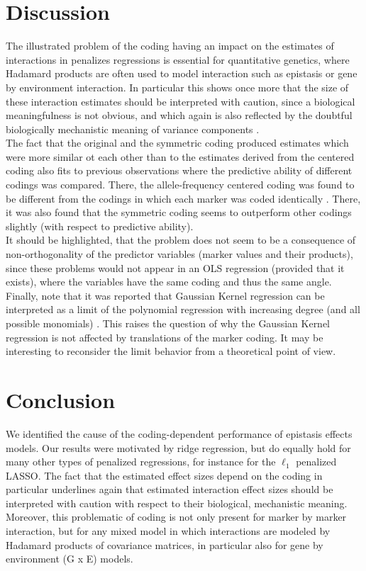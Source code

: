 \documentclass{bmcart}
\newcommand{\0}{\mathbf{0}}
\begin{document}
\section*{Discussion}
The illustrated problem of the coding having an impact on the estimates of interactions in penalizes regressions is essential for quantitative genetics, where Hadamard products are often used to model interaction such as epistasis or gene by environment interaction. In particular this shows once more that the size of these interaction estimates should be interpreted with caution, since a biological meaningfulness is not obvious, and which again is also reflected by the doubtful biologically mechanistic meaning of variance components \cite{Huang16}.\\

The fact that the original and the symmetric coding produced estimates which were more similar ot each other than to the estimates derived from the centered coding also fits to previous observations where the predictive ability of different codings was compared. There, the allele-frequency centered coding was found to be different from the codings in which each marker was coded identically \cite{Martini17}. 
There, it was also found that the symmetric coding seems to outperform other codings slightly (with respect to predictive ability). \\

It should be highlighted, that the problem does not seem to be a consequence of non-orthogonality of the predictor variables (marker values and their products), since these problems would not appear in an OLS regression (provided that it exists), where the variables have the same coding and thus the same angle. \\

Finally, note that it was reported that Gaussian Kernel regression \cite{Morota14} can be interpreted as a limit of the polynomial regression with increasing degree (and all possible monomials) \cite{jiang15}. 
This raises the question of why the Gaussian Kernel regression is not affected by translations of the marker coding. It may be interesting to reconsider the limit behavior from a theoretical point of view.


\section*{Conclusion}
We identified the cause of the coding-dependent performance of epistasis effects models. Our results were motivated by ridge regression, but do equally hold for many other types of penalized regressions, for instance for the $\ell_1$ penalized LASSO. The fact that the estimated effect sizes depend on the coding in particular underlines again that estimated interaction effect sizes should be interpreted with caution with respect to their biological, mechanistic meaning. Moreover, this problematic of coding is not only present for marker by marker interaction, but for any mixed model in which interactions are modeled by Hadamard products of covariance matrices, in particular also for gene by environment (G x E) models.
\end{document}
